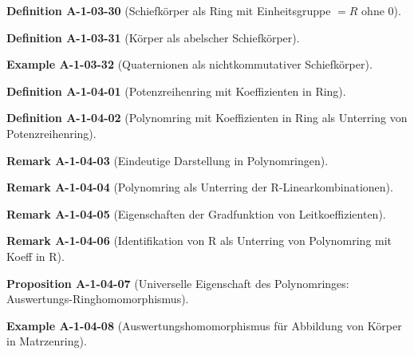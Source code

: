 \documentclass[10pt, letterpaper]{article}
\newcommand{\CustomHeading}[3]{%
  \par\medskip\noindent%
  \textbf{#1 #2} \textnormal{(#3)}.\enskip%
}
\newenvironment{DEF}[2]{\CustomHeading{Definition}{#1}{#2}}{}
\newenvironment{PROP}[2]{\CustomHeading{Proposition}{#1}{#2}}{}
\newenvironment{REM}[2]{\CustomHeading{Remark}{#1}{#2}}{}
\newenvironment{EXA}[2]{\CustomHeading{Example}{#1}{#2}}{}
\begin{document}
\begin{DEF}{A-1-03-30}{Schiefkörper als Ring mit Einheitsgruppe $= R$ ohne $0$}
\end{DEF}

\begin{DEF}{A-1-03-31}{Körper als abelscher Schiefkörper}
\end{DEF}

\begin{EXA}{A-1-03-32}{Quaternionen als nichtkommutativer Schiefkörper}
\end{EXA}

\begin{DEF}{A-1-04-01}{Potenzreihenring mit Koeffizienten in Ring}
\end{DEF}

\begin{DEF}{A-1-04-02}{Polynomring mit Koeffizienten in Ring als Unterring von Potenzreihenring}
\end{DEF}

\begin{REM}{A-1-04-03}{Eindeutige Darstellung in Polynomringen}
\end{REM}

\begin{REM}{A-1-04-04}{Polynomring als Unterring der R-Linearkombinationen}
\end{REM}

\begin{REM}{A-1-04-05}{Eigenschaften der Gradfunktion von Leitkoeffizienten}
\end{REM}

\begin{REM}{A-1-04-06}{Identifikation von R als Unterring von Polynomring mit Koeff in R}
\end{REM}

\begin{PROP}{A-1-04-07}{Universelle Eigenschaft des Polynomringes: Auswertungs-Ringhomomorphismus}
\end{PROP}

\begin{EXA}{A-1-04-08}{Auswertungshomomorphismus für Abbildung von Körper in Matrzenring}
\end{EXA}
\end{document}
